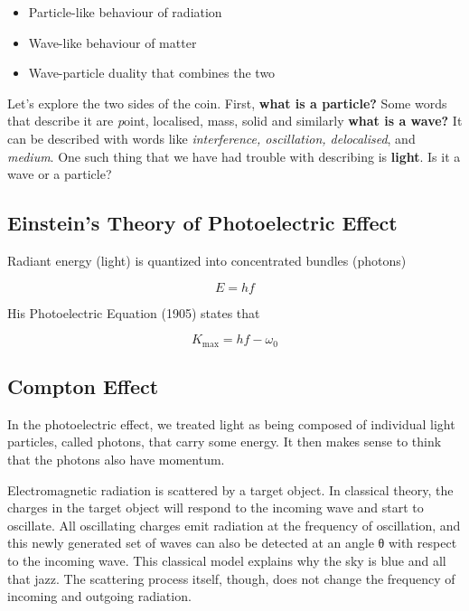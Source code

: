 \documentclass[english, 11pt]{article}
\begin{document}
       \begin{itemize}
         \item Particle-like behaviour of radiation
         \item Wave-like behaviour of matter
         \item Wave-particle duality that combines the two
       \end{itemize}

       Let's explore the two sides of the coin. First, {\bf what is a particle?} Some words that describe it are {\textit point, localised, mass, solid} and similarly {\bf what is a wave?} It can be described with words like \textit{interference, oscillation, delocalised}, and \textit{medium}. One such thing that we have had trouble with describing is {\bf light}. Is it a wave or a particle?

     \subsection{Einstein's Theory of Photoelectric Effect}

       Radiant energy (light) is quantized into concentrated bundles (photons)

       \[ E = hf \]

       His Photoelectric Equation (1905) states that

       \[ K_{\mbox{max}} = hf - \omega_0 \]

     \subsection{Compton Effect}

       In the photoelectric effect, we treated light as being composed of individual light particles, called photons, that carry some energy. It then makes sense to think that the photons also have momentum.
       \newline

       Electromagnetic radiation is scattered by a target object. In classical theory, the charges in the target object will respond to the incoming wave and start to oscillate. All oscillating charges emit radiation at the frequency of oscillation, and this newly generated set of waves can also be detected at an angle θ with respect to the incoming wave. This classical model explains why the sky is blue and all that jazz. The scattering process itself, though, does not change the frequency of incoming and outgoing radiation.
       \newline
\end{document}
